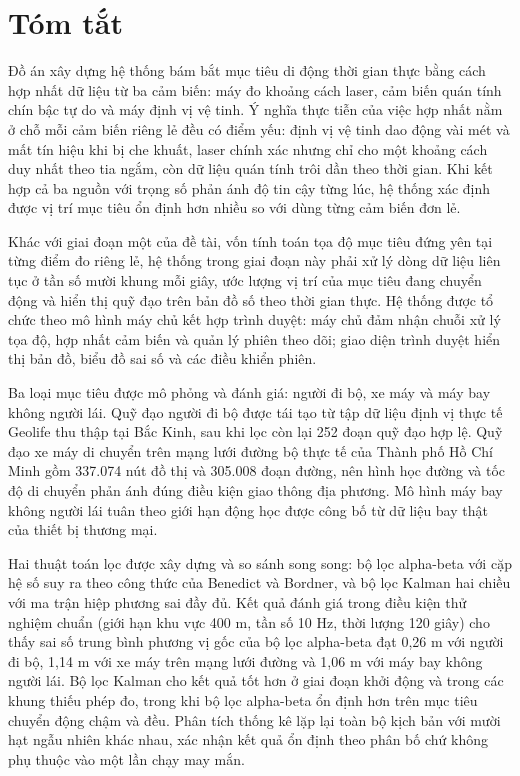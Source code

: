 \section*{Tóm tắt}
\thispagestyle{empty}

\hspace{0.5cm} Đồ án xây dựng hệ thống bám bắt mục tiêu di động thời gian thực bằng cách hợp nhất dữ liệu từ ba cảm biến: máy đo khoảng cách laser, cảm biến quán tính chín bậc tự do và máy định vị vệ tinh. Ý nghĩa thực tiễn của việc hợp nhất nằm ở chỗ mỗi cảm biến riêng lẻ đều có điểm yếu: định vị vệ tinh dao động vài mét và mất tín hiệu khi bị che khuất, laser chính xác nhưng chỉ cho một khoảng cách duy nhất theo tia ngắm, còn dữ liệu quán tính trôi dần theo thời gian. Khi kết hợp cả ba nguồn với trọng số phản ánh độ tin cậy từng lúc, hệ thống xác định được vị trí mục tiêu ổn định hơn nhiều so với dùng từng cảm biến đơn lẻ.

Khác với giai đoạn một của đề tài, vốn tính toán tọa độ mục tiêu đứng yên tại từng điểm đo riêng lẻ, hệ thống trong giai đoạn này phải xử lý dòng dữ liệu liên tục ở tần số mười khung mỗi giây, ước lượng vị trí của mục tiêu đang chuyển động và hiển thị quỹ đạo trên bản đồ số theo thời gian thực. Hệ thống được tổ chức theo mô hình máy chủ kết hợp trình duyệt: máy chủ đảm nhận chuỗi xử lý tọa độ, hợp nhất cảm biến và quản lý phiên theo dõi; giao diện trình duyệt hiển thị bản đồ, biểu đồ sai số và các điều khiển phiên.

Ba loại mục tiêu được mô phỏng và đánh giá: người đi bộ, xe máy và máy bay không người lái. Quỹ đạo người đi bộ được tái tạo từ tập dữ liệu định vị thực tế Geolife thu thập tại Bắc Kinh, sau khi lọc còn lại 252 đoạn quỹ đạo hợp lệ. Quỹ đạo xe máy di chuyển trên mạng lưới đường bộ thực tế của Thành phố Hồ Chí Minh gồm 337.074 nút đồ thị và 305.008 đoạn đường, nên hình học đường và tốc độ di chuyển phản ánh đúng điều kiện giao thông địa phương. Mô hình máy bay không người lái tuân theo giới hạn động học được công bố từ dữ liệu bay thật của thiết bị thương mại.

Hai thuật toán lọc được xây dựng và so sánh song song: bộ lọc alpha-beta với cặp hệ số suy ra theo công thức của Benedict và Bordner, và bộ lọc Kalman hai chiều với ma trận hiệp phương sai đầy đủ. Kết quả đánh giá trong điều kiện thử nghiệm chuẩn (giới hạn khu vực 400 m, tần số 10 Hz, thời lượng 120 giây) cho thấy sai số trung bình phương vị gốc của bộ lọc alpha-beta đạt 0{,}26 m với người đi bộ, 1{,}14 m với xe máy trên mạng lưới đường và 1{,}06 m với máy bay không người lái. Bộ lọc Kalman cho kết quả tốt hơn ở giai đoạn khởi động và trong các khung thiếu phép đo, trong khi bộ lọc alpha-beta ổn định hơn trên mục tiêu chuyển động chậm và đều. Phân tích thống kê lặp lại toàn bộ kịch bản với mười hạt ngẫu nhiên khác nhau, xác nhận kết quả ổn định theo phân bố chứ không phụ thuộc vào một lần chạy may mắn.

